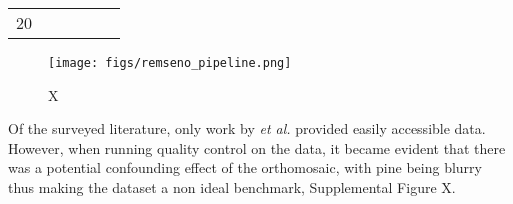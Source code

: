 \documentclass[9pt,lineno]{elife}
\begin{document}
\begin{table}[]
\begin{fullwidth}
\begin{tabular}{p{1cm}p{4cm}p{4cm}p{4cm}p{1cm}p{2cm}}
20 & \cite{Wang_Zhou_Hu_Tang_Ge_Smith_Awada_Shi_2021}                                                                                                                              &                                                                               &                                                                                                                                 &                  &
\end{tabular}
\end{fullwidth}
\end{table}


\begin{figure}

\begin{fullwidth}
\texttt{[image: figs/remseno\_pipeline.png]}
\caption{X}
\label{fig:pipeline}
\end{fullwidth}
\end{figure}

Of the surveyed literature, only work by \cite{Wang_Zhou_Hu_Tang_Ge_Smith_Awada_Shi_2021} \textit{et al.} provided easily accessible data. However, when running quality control on the data, it became evident that there was a potential confounding effect of the orthomosaic, with pine being blurry thus making the dataset a non ideal benchmark, Supplemental Figure X.
\end{document}
